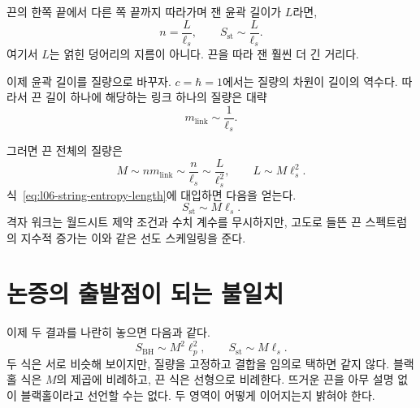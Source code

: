 끈의 한쪽 끝에서 다른 쪽 끝까지 따라가며 잰 윤곽 길이가 \(L\)라면,
\begin{equation}
n=\frac{L}{\ell_s},
\qquad
S_{\mathrm{st}}\sim\frac{L}{\ell_s}.
\label{eq:l06-string-entropy-length}
\end{equation}
여기서 \(L\)는 얽힌 덩어리의 지름이 아니다. 끈을 따라 잰 훨씬 더 긴 거리다.

이제 윤곽 길이를 질량으로 바꾸자. \(c=\hbar=1\)에서는 질량의 차원이 길이의 역수다. 따라서 끈 길이 하나에 해당하는 링크 하나의 질량은 대략
\begin{equation}
m_{\mathrm{link}}\sim\frac{1}{\ell_s}.
\label{eq:l06-link-mass}
\end{equation}

\begin{classroomqa}
\end{classroomqa}

그러면 끈 전체의 질량은
\begin{equation}
M\sim n m_{\mathrm{link}}
\sim\frac{n}{\ell_s}
\sim\frac{L}{\ell_s^2},
\qquad
L\sim M\ell_s^2.
\label{eq:l06-string-mass}
\end{equation}
식~\eqref{eq:l06-string-entropy-length}에 대입하면 다음을 얻는다.
\begin{equation}
S_{\mathrm{st}}\sim M\ell_s.
\label{eq:l06-string-entropy-mass}
\end{equation}
격자 워크는 월드시트 제약 조건과 수치 계수를 무시하지만, 고도로 들뜬 끈 스펙트럼의 지수적 증가는 이와 같은 선도 스케일링을 준다.

\section{논증의 출발점이 되는 불일치}

이제 두 결과를 나란히 놓으면 다음과 같다.
\begin{equation}
S_{\mathrm{BH}}\sim M^2\ell_p^2,
\qquad
S_{\mathrm{st}}\sim M\ell_s.
\label{eq:l06-two-entropies}
\end{equation}
두 식은 서로 비슷해 보이지만, 질량을 고정하고 결합을 임의로 택하면 같지 않다. 블랙홀 식은 \(M\)의 제곱에 비례하고, 끈 식은 선형으로 비례한다. 뜨거운 끈을 아무 설명 없이 블랙홀이라고 선언할 수는 없다. 두 영역이 어떻게 이어지는지 밝혀야 한다.

